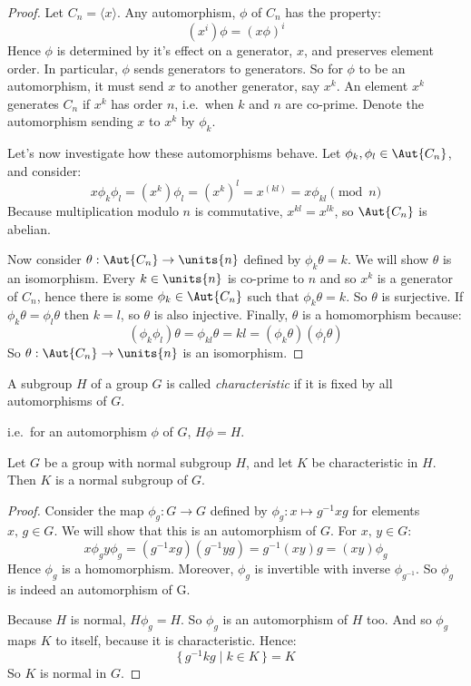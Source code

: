 \begin{proof}
    Let \(C_n = \langle x \rangle\).
    Any automorphism, \(\phi\) of \(C_n\) has the property:
    \[(x^i)\phi = {(x\phi)}^i\]
    Hence \(\phi\) is determined by it's effect on a generator, \(x\), and preserves element
    order.
    In particular, \(\phi\) sends generators to generators.
    So for \(\phi\) to be an automorphism, it must send \(x\) to another generator, say \(x^k\).
    An element \(x^k\) generates \(C_n\) if \(x^k\) has order \(n\), i.e.\ when \(k\) and \(n\) are co-prime.
    Denote the automorphism sending \(x\) to \(x^k\) by \(\phi_k\).

    Let's now investigate how these automorphisms behave.
    Let \(\phi_k, \phi_l \in \Aut{C_n}\), and consider:
    \[x\phi_k\phi_l = (x^k)\phi_l = {(x^k)}^l = x^{(kl)} = x\phi_{kl} \pmod{n}\]
    Because multiplication modulo \(n\) is commutative, \(x^{kl} = x^{lk}\), so \(\Aut{C_n}\) is abelian.

    Now consider \(\theta:\Aut{C_n} \to \units{n}\) defined by \(\phi_k\theta = k\).
    We will show \(\theta\) is an isomorphism.
    Every \(k \in \units{n}\) is co-prime to \(n\) and so \(x^k\) is a generator of \(C_n\), hence there is some \(\phi_k
    \in \Aut{C_n}\) such that \(\phi_k\theta = k\).
    So \(\theta\) is surjective.
    If \(\phi_k\theta = \phi_l\theta\) then \(k = l\), so \(\theta\) is also injective.
    Finally, \(\theta\) is a homomorphism because:
    \[(\phi_k\phi_l)\theta = \phi_{kl}\theta = kl = (\phi_k\theta)(\phi_l\theta)\]
    So \(\theta:\Aut{C_n} \to \units{n}\) is an isomorphism.
\end{proof}

\begin{definition}
    \raggedright
    A subgroup \(H\) of a group \(G\) is called \emph{characteristic} if it is fixed by all automorphisms of
    \(G\).

    i.e.\ for an automorphism \(\phi\) of \(G\), \(H\phi = H\).
\end{definition}

\begin{lemma}\label{lem:char}
    \raggedright
    Let \(G\) be a group with normal subgroup \(H\), and let \(K\) be characteristic in \(H\).
    Then \(K\) is a normal subgroup of \(G\).
\end{lemma}

\begin{proof}
    Consider the map \(\phi_g:G \to G\) defined by \(\phi_g:x \mapsto g^{-1}xg\) for elements \(x,\,g \in G\).
    We will show that this is an automorphism of \(G\).
    For \(x,\,y \in G\):
    \[x\phi_g y\phi_g = (g^{-1}xg)(g^{-1}yg) = g^{-1}(xy)g = (xy)\phi_g\]
    Hence \(\phi_g\) is a homomorphism.
    Moreover, \(\phi_g\) is invertible with inverse \(\phi_{g^{-1}}\).
    So \(\phi_g\) is indeed an automorphism of G.

    Because \(H\) is normal, \(H\phi_g = H\).
    So \(\phi_g\) is an automorphism of \(H\) too.
    And so \(\phi_g\) maps \(K\) to itself, because it is characteristic.
    Hence:
    \[\{\,g^{-1}kg \mid k \in K\,\} = K\]
    So \(K\) is normal in \(G\).
\end{proof}

